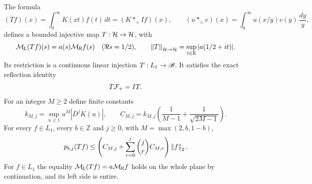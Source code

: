 \begin{mburntheorem}\label{mburn:thm:T}
The formula
\begin{equation}\label{mburn:eq:T}
 (Tf)(x)=\int_0^\infty K(xt)f(t)\,dt
       =(K*_\times If)(x),\qquad
 (u*_\times v)(x)=\int_0^\infty u(x/y)v(y)\,\frac{dy}{y},
\end{equation}
defines a bounded injective map $T:\mathcal H\to\mathcal H$, with
\begin{equation}\label{mburn:eq:Tsymbol}
 \mathcal M_{\!L}(Tf)(s)=a(s)\mathcal M_{\!R} f(s)\quad(\Re s=1/2),\qquad
 \left\lVert T\right\rVert_{\mathcal H\to\mathcal H}=\sup_{t\in\mathbb R}|a(1/2+it)|.
\end{equation}
Its restriction is a continuous linear injection
$T:L_1\to\mathscr B$. It satisfies the exact reflection identity
\begin{equation}\label{mburn:eq:Tsym}
 T\mathcal F_+=IT.
\end{equation}
For an integer $M\geq2$ define finite constants
\begin{equation}\label{mburn:eq:constants}
 k_{M,j}=\sup_{u\geq1}u^M|D^jK(u)|,\qquad
 C_{M,j}=k_{M,j}\left(\frac1{M-1}+\frac1{\sqrt{2M-1}}\right).
\end{equation}
For every $f\in L_1$, every $b\in\mathbb Z$ and $j\geq0$,
with $M=\max(2,b,1-b)$,
\begin{equation}\label{mburn:eq:strongbound}
 p_{b,j}(Tf)\leq
 \left(C_{M,j}+\sum_{r=0}^j\binom jr C_{M,r}\right)\left\lVert f\right\rVert_2.
\end{equation}
For $f\in L_1$ the equality $\mathcal M_{\!L}(Tf)=a\mathcal M_{\!R} f$ holds on the
whole plane by continuation, and its left side is entire.
\end{mburntheorem}
